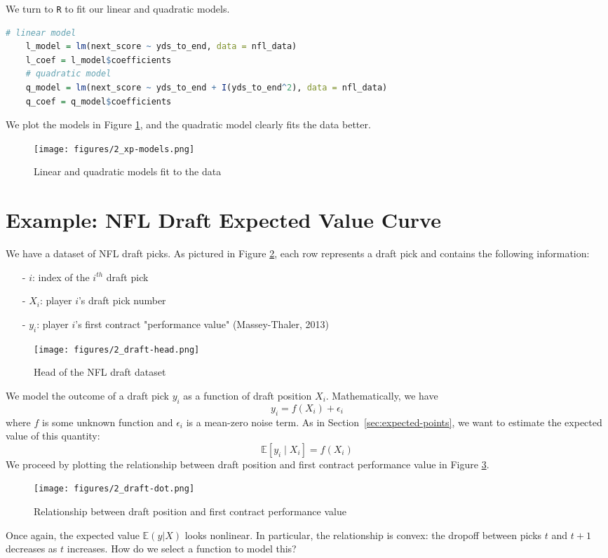 \documentclass[twoside]{article}
\theoremstyle{definition}
\begin{document}
We turn to \texttt{R} to fit our linear and quadratic models.
\begin{lstlisting}[language=R]
    # linear model
    l_model = lm(next_score ~ yds_to_end, data = nfl_data)
    l_coef = l_model$coefficients
    # quadratic model
    q_model = lm(next_score ~ yds_to_end + I(yds_to_end^2), data = nfl_data)
    q_coef = q_model$coefficients
\end{lstlisting}
We plot the models in Figure \ref{fig:xp-models}, and the quadratic model clearly fits the data better.
\begin{figure}[H]
    \centering
    \texttt{[image: figures/2\_xp-models.png]}
    \caption{Linear and quadratic models fit to the data}
    \label{fig:xp-models}
\end{figure}

\section{Example: NFL Draft Expected Value Curve}

We have a dataset of NFL draft picks. As pictured in Figure \ref{fig:draft-head}, each row represents a draft pick and contains the following information:
\begin{itemize} 
    \item[-] $i$: index of the $i^{th}$ draft pick
    \item[-] $X_i$: player $i$'s draft pick number
    \item[-] $y_i$: player $i$'s first contract "performance value" (Massey-Thaler, 2013)
\end{itemize}

\begin{figure}[H]
    \centering
    \texttt{[image: figures/2\_draft-head.png]}
    \caption{Head of the NFL draft dataset}
    \label{fig:draft-head}
\end{figure}
We model the outcome of a draft pick $y_i$ as a function of draft position $X_i$. Mathematically, we have
\begin{equation}
    y_i = f(X_i) + \epsilon_i
\end{equation}
where $f$ is some unknown function and $\epsilon_i$ is a mean-zero noise term. As in Section~\ref{sec:expected-points}, we want to estimate the expected value of this quantity:
\begin{equation}
    \mathbb{E}[y_i \mid X_i] = f(X_i)
\end{equation}
We proceed by plotting the relationship between draft position and first contract performance value in Figure \ref{fig:draft-dot}.
\begin{figure}[H]
    \centering
    \texttt{[image: figures/2\_draft-dot.png]}
    \caption{Relationship between draft position and first contract performance value}
    \label{fig:draft-dot}
\end{figure}
Once again, the expected value $\mathbb{E}(y|X)$ looks nonlinear. In particular, the relationship is convex: the dropoff between picks $t$ and $t+1$ decreases as $t$ increases. How do we select a function to model this?
\end{document}
